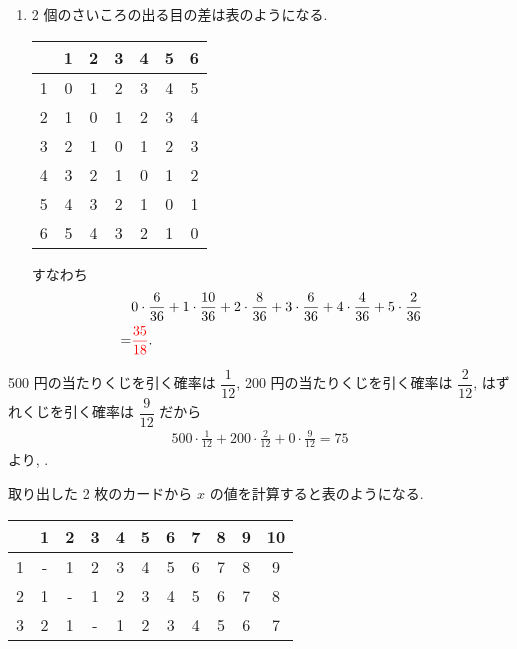 \begin{qenumerate}
{\begin{enumerate}
{				\begin{align}
					\left(\dfrac{1}{2}\right)^{3} = \dfrac{1}{8}
				\end{align}
				である.
				すなわち
				\begin{align}
					0\cdot\frac{1}{8} + 1\cdot\frac{3}{8} + 2\cdot\frac{3}{8} + 3\cdot\frac{1}{8} = \red{\frac{3}{2}}.
				\end{align}
			}
			\item{
				2 個のさいころの出る目の差は表のようになる.
				\begin{table}[H]
					\centering
					\begin{tabular}{c|cccccc}
						  & 1 & 2 & 3 & 4 & 5 & 6 \\ \hline
						1 & 0 & 1 & 2 & 3 & 4 & 5 \\
						2 & 1 & 0 & 1 & 2 & 3 & 4 \\
						3 & 2 & 1 & 0 & 1 & 2 & 3 \\
						4 & 3 & 2 & 1 & 0 & 1 & 2 \\
						5 & 4 & 3 & 2 & 1 & 0 & 1 \\
						6 & 5 & 4 & 3 & 2 & 1 & 0
					\end{tabular}
				\end{table}
				すなわち
				\begin{align}
					& 0\cdot\frac{6}{36} + 1\cdot\frac{10}{36} + 2\cdot\frac{8}{36} + 3\cdot\frac{6}{36} + 4\cdot\frac{4}{36} + 5\cdot\frac{2}{36} \\
						=& \textcolor{red}{\frac{35}{18}}.
				\end{align}
			}
		\end{enumerate}
	}
	\item{
		500 円の当たりくじを引く確率は $\dfrac{1}{12}$, 200 円の当たりくじを引く確率は $\dfrac{2}{12}$, はずれくじを引く確率は $\dfrac{9}{12}$ だから
		\begin{align}
			500\cdot\frac{1}{12} + 200\cdot\frac{2}{12} + 0\cdot\frac{9}{12} = 75
		\end{align}
		より, .
	}
	\item{
		取り出した 2 枚のカードから $x$ の値を計算すると表のようになる.
		\begin{table}[H]
			\centering
			\begin{tabular}{c|cccccccccc}
				   & 1 & 2 & 3 & 4 & 5 & 6 & 7 & 8 & 9 & 10 \\ \hline
				 1 & - & 1 & 2 & 3 & 4 & 5 & 6 & 7 & 8 &  9 \\
				 2 & 1 & - & 1 & 2 & 3 & 4 & 5 & 6 & 7 &  8 \\
				 3 & 2 & 1 & - & 1 & 2 & 3 & 4 & 5 & 6 &  7 \\

\end{tabular}
\end{table}}
\end{qenumerate}
